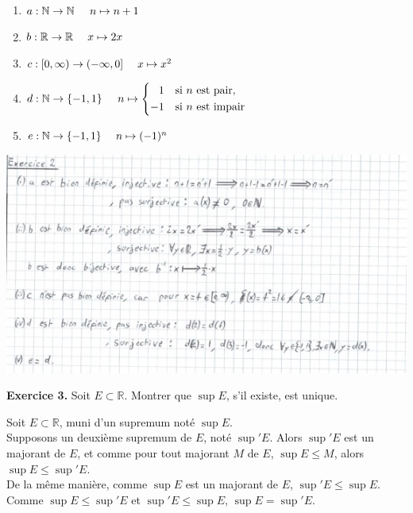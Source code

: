 \documentclass[a4paper, 10pt]{report}
\begin{document}
	\begin{enumerate}[label=(\roman*)]
		\item $a : \mathbb{N} \to \mathbb{N}\\
			\phantom{a :\ } n \mapsto n + 1$
		\vspace{5pt}
		\item $b : \mathbb{R} \to \mathbb{R}\\
			\phantom{b :\ } x \mapsto 2x$
		\vspace{5pt}
		\item $c : [0, \infty) \to (-\infty, 0]\\
			\phantom{c :\ } x \mapsto x^2$
		\vspace{5pt}
		\item $d : \mathbb{N} \to \{-1, 1\}\\
			\phantom{d :\ } n \mapsto
			\left\{\begin{aligned}
				&1 & &\text{si}\ n\ \text{est pair},\\
				-&1 & &\text{si}\ n\ \text{est impair}
			\end{aligned}\right.$
		\vspace{5pt}
		\item $e : \mathbb{N} \to \{-1, 1\}\\
			\phantom{e :\ } n \mapsto (-1)^n$
	\end{enumerate}
	
	\includegraphics{ex02.jpg}
	
	\vspace{5mm}	
	\noindent
	\textbf{Exercice 3.} Soit $E \subset \mathbb{R}$. Montrer que
	$\sup{E}$, s'il existe, est unique.
	
	\colorbox{solution}
	{
		\begin{minipage}{0.9\textwidth}
			Soit $E \subset \mathbb{R}$, muni d'un supremum noté
			$\sup{E}$.\\
			Supposons un deuxième supremum de $E$, noté $\sup'{E}$.
			Alors $\sup'{E}$ est un majorant de $E$, et comme pour
			tout majorant $M$ de $E$, $\sup{E} \leq M$, alors
			$\sup{E} \leq \sup'{E}$.\\
			
			De la même manière, comme $\sup{E}$ est un majorant de $E$,
			$\sup'{E} \leq \sup{E}$.\\
			Comme $\sup{E} \leq \sup'{E}$ et $\sup'{E} \leq \sup{E}$,
			$\sup{E} = \sup'{E}$.
		\end{minipage}
	}
	
\end{document}
